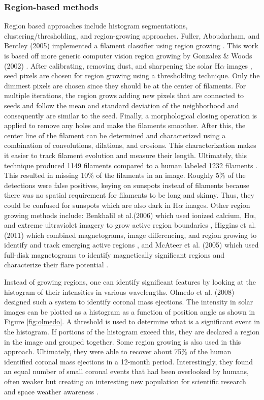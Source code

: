 \documentclass[twoside]{report}
\begin{document}
\subsubsection{Region-based methods}
Region based approaches include histogram segmentations, clustering/thresholding, and region-growing approaches. Fuller, Aboudarham, and Bentley (2005) implemented a filament classifier using region growing \cite{fuller:2005}. This work is based off more generic computer vision region growing by Gonzalez \& Woods (2002) \cite{gonzalez:2002}. After calibrating, removing dust, and sharpening the solar H$\alpha$ images \cite{standardization}, seed pixels are chosen for region growing using a thresholding technique. Only the dimmest pixels are chosen since they should be at the center of filaments. For multiple iterations, the region grows adding new pixels that are connected to seeds and follow the mean and standard deviation of the neighborhood and consequently are similar to the seed. Finally, a morphological closing operation is applied to remove any holes and make the filaments smoother. After this, the center line of the filament can be determined and characterized using a combination of convolutions, dilations, and erosions. This characterization makes it easier to track filament evolution and measure their length. Ultimately, this technique produced 1149 filaments compared to a human labeled 1232 filaments \cite{fuller:2005}. This resulted in missing 10\% of the filaments in an image. Roughly 5\% of the detections were false positives, keying on sunspots instead of filaments because there was no spatial requirement for filaments to be long and skinny. Thus, they could be confused for sunspots which are also dark in H$\alpha$ images. Other region growing methods include: Benkhalil et al.(2006) which used ionized calcium, H$\alpha$, and extreme ultraviolet imagery to grow active region boundaries \cite{benkhalil}, Higgins et al. (2011) which combined magnetograms, image differencing, and region growing to identify and track emerging active regions \cite{higgins}, and McAteer et al. (2005) which used full-disk magnetograms to identify magnetically significant regions and characterize their flare potential \cite{mcateer}. 

Instead of growing regions, one can identify significant features by looking at the histogram of their intensities in various wavelengths. Olmedo et al. (2008) designed such a system to identify coronal mass ejections. The intensity in solar images can be plotted as a histogram as a function of position angle as shown in Figure \ref{fig:olmedo}. A threshold is used to determine what is a significant event in the histogram. If portions of the histogram exceed this, they are declared a region in the image and grouped together. Some region growing is also used in this approach. Ultimately, they were able to recover about 75\% of the human identified coronal mass ejections in a 12-month period. Interestingly, they found an equal number of small coronal events that had been overlooked by humans, often weaker but creating an interesting new population for scientific research and space weather awareness \cite{olmedo2008automatic}. 
\end{document}
